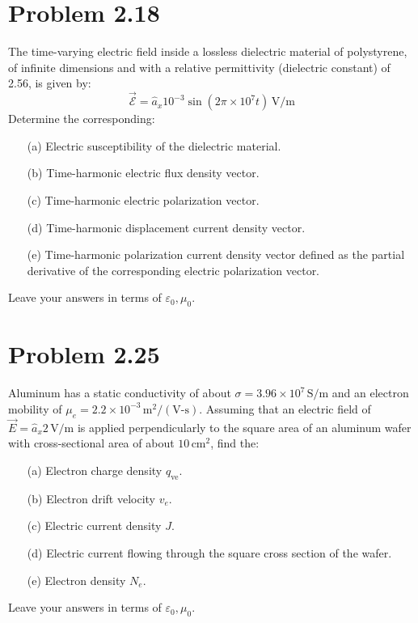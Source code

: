 \documentclass[12pt]{article}
\begin{document}
    
\section*{Problem 2.18}
The time-varying electric field inside a lossless dielectric material of polystyrene, of infinite dimensions and with a relative permittivity (dielectric constant) of 2.56, is given by:
\[
\vec{\mathcal{E}} = \hat{a}_x 10^{-3} \sin(2\pi \times 10^7 t) \, \text{V/m}
\]
Determine the corresponding:
\begin{itemize}
    \item[(a)] Electric susceptibility of the dielectric material.
    \item[(b)] Time-harmonic electric flux density vector.
    \item[(c)] Time-harmonic electric polarization vector.
    \item[(d)] Time-harmonic displacement current density vector.
    \item[(e)] Time-harmonic polarization current density vector defined as the partial derivative of the corresponding electric polarization vector.
\end{itemize}
Leave your answers in terms of \( \varepsilon_0, \mu_0 \).

\section*{Problem 2.25}
Aluminum has a static conductivity of about \( \sigma = 3.96 \times 10^7 \, \text{S/m} \) and an electron mobility of \( \mu_e = 2.2 \times 10^{-3} \, \text{m}^2/(\text{V-s}) \). Assuming that an electric field of \( \vec{E} = \hat{a}_x 2 \, \text{V/m} \) is applied perpendicularly to the square area of an aluminum wafer with cross-sectional area of about \( 10 \, \text{cm}^2 \), find the:
\begin{itemize}
    \item[(a)] Electron charge density \( q_{\text{ve}} \).
    \item[(b)] Electron drift velocity \( v_e \).
    \item[(c)] Electric current density \( J \).
    \item[(d)] Electric current flowing through the square cross section of the wafer.
    \item[(e)] Electron density \( N_e \).
\end{itemize}
Leave your answers in terms of \( \varepsilon_0, \mu_0 \).




\end{document}
